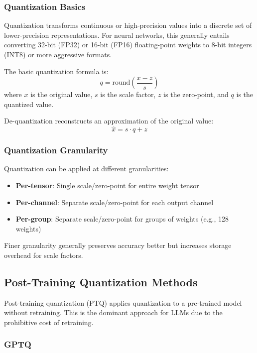 \documentclass[11pt]{article}
\begin{document}
\subsubsection{Quantization Basics}

Quantization transforms continuous or high-precision values into a discrete set of lower-precision representations. For neural networks, this generally entails converting 32-bit (FP32) or 16-bit (FP16) floating-point weights to 8-bit integers (INT8) or more aggressive formats.

The basic quantization formula is:
\begin{equation}
q = \text{round}\left(\frac{x - z}{s}\right)
\end{equation}
where $x$ is the original value, $s$ is the scale factor, $z$ is the zero-point, and $q$ is the quantized value.

De-quantization reconstructs an approximation of the original value:
\begin{equation}
\hat{x} = s \cdot q + z
\end{equation}

\subsubsection{Quantization Granularity}

Quantization can be applied at different granularities:
\begin{itemize}
    \item \textbf{Per-tensor}: Single scale/zero-point for entire weight tensor
    \item \textbf{Per-channel}: Separate scale/zero-point for each output channel
    \item \textbf{Per-group}: Separate scale/zero-point for groups of weights (e.g., 128 weights)
\end{itemize}

Finer granularity generally preserves accuracy better but increases storage overhead for scale factors.

\subsection{Post-Training Quantization Methods}

Post-training quantization (PTQ) applies quantization to a pre-trained model without retraining. This is the dominant approach for LLMs due to the prohibitive cost of retraining.

\subsubsection{GPTQ}
\end{document}
